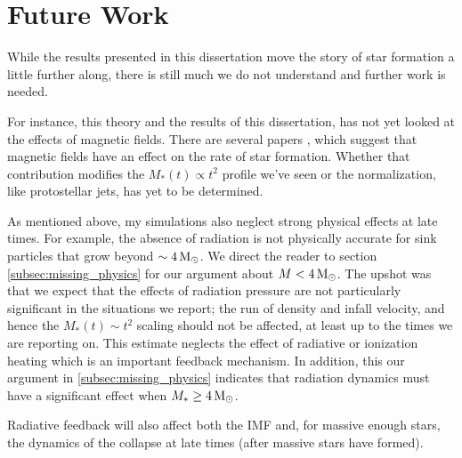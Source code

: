 \documentclass[../dissertation.tex]{subfiles}
\begin{document}
\section{Future Work}
While the results presented in this dissertation move the story of star formation a little further along, 
there is still much we do not understand and further work is needed. 

For instance, this theory and the results of this dissertation, has not yet looked at the effects of magnetic fields. 
There are several papers \citep{2009ApJ...704..891L,2015ApJ...808...48B,2017ApJ...838...40M} , which suggest that magnetic fields have an effect on the rate of star formation. 
Whether that contribution modifies the $M_*(t) \propto t^2$ profile we've seen or the normalization, like protostellar jets, has yet to be determined. 

As mentioned above, my simulations also neglect strong physical effects at late times. 
For example, the absence of radiation is not physically accurate for sink particles that grow beyond $\sim 4 {\,\rm M}_\odot$.
We direct the reader to section \ref{subsec:missing_physics} for our argument about $M < 4 {\,\rm M}_\odot$. 
The upshot was that we expect that the effects of radiation pressure are not particularly significant in the situations we report; 
the run of density and infall velocity, and hence the $M_*(t)\sim t^2$ scaling should not be affected, at least up to the times we are reporting on. 
This estimate neglects the effect of radiative or ionization heating which is an important feedback mechanism. 
In addition, this our argument in \ref{subsec:missing_physics} indicates that radiation dynamics must have a significant effect when $M_* \ge 4 {\,\rm M}_\odot$. 


Radiative feedback will also affect both the IMF and, for massive enough stars, the dynamics of the collapse at late times (after massive stars have formed). 
\end{document}
